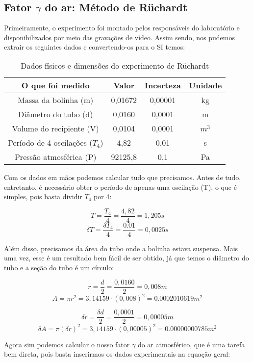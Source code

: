 \subsection{Fator $\gamma$ do ar: Método de Rüchardt}

Primeiramente, o experimento foi montado pelos responsáveis do laboratório e disponibilizados por meio das gravações de vídeo. Assim sendo, nos pudemos extrair os seguintes dados e convertendo-os para o SI temos:

\begin{table}[H]
    \centering
    \begin{tabular}{ |c||c||c||c|  }
        \hline
        \textbf{O que foi medido} & \textbf{Valor} & \textbf{Incerteza} & \textbf{Unidade}\\
        \hline 
         Massa da bolinha (m)       & 0,01672   & 0,00001   & kg\\
         Diâmetro do tubo (d)       & 0,0160    & 0,0001    & m\\
         Volume do recipiente (V)   & 0,0104    & 0,0001    & $m^3$\\
         \hline
         Período de 4 oscilações ($T_4$) & 4,82 & 0,01 & s\\
         \hline
         Pressão atmosférica (P) & 92125,8 & 0,1 & Pa\\
        \hline
    \end{tabular}
    \caption{Dados físicos e dimensões do experimento de Rüchardt} 
\end{table}

Com os dados em mãos podemos calcular tudo que precisamos. Antes de tudo, entretanto, é necessário obter o período de apenas uma oscilação (T), o que é simples, pois basta dividir $T_4$ por 4:

\[ T = \frac{T_4}{4} = \frac{4,82}{4} = 1,205 s \]
\[ \delta T = \frac{\delta T_4}{4} = \frac{0.01}{4} = 0,0025 s \]

Além disso, precisamos da área do tubo onde a bolinha estava suspensa. Mais uma vez, esse é um resultado bem fácil de ser obtido, já que temos o diâmetro do tubo e a seção do tubo é um círculo:

\[ r = \frac{d}{2} = \frac{0,0160}{2} = 0,008 m \]
\[ A = \pi r^2 = 3,14159 \cdot (0,008)^2 = 0.0002010619 m^2 \]

\[ \delta r = \frac{\delta d}{2} = \frac{0,0001}{2} = 0,00005 m \]
\[ \delta A = \pi (\delta r)^2 = 3,14159 \cdot (0,00005)^2 = 0.00000000785 m^2 \]

Agora sim podemos calcular o nosso fator $\gamma$ do ar atmosférico, que é uma tarefa bem direta, pois basta inserirmos os dados experimentais na equação geral:

